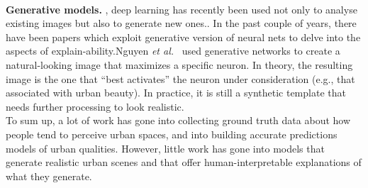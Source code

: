 \mbox{}\\
\noindent
\textbf{Generative models.} , deep learning has recently been used not only to analyse existing images but also to generate new ones.. In the past couple of years, there have been papers which exploit generative version of neural nets to delve into the aspects of explain-ability.Nguyen \emph{et al.}~\cite{nguyen2016synthesizing} used generative networks to create a natural-looking image that maximizes a specific neuron. In theory, the resulting image is the one that ``best activates'' the neuron under consideration (e.g., that associated with urban beauty). In practice, it is still a synthetic template that needs further processing to look realistic. 
\mbox{}\\

\mbox{}
To sum up, a lot of work has gone into collecting ground truth data about how people tend to perceive urban spaces, and into building accurate predictions models of urban qualities. However,  little work has gone into models that generate realistic urban scenes and that offer human-interpretable explanations of what they generate. 


